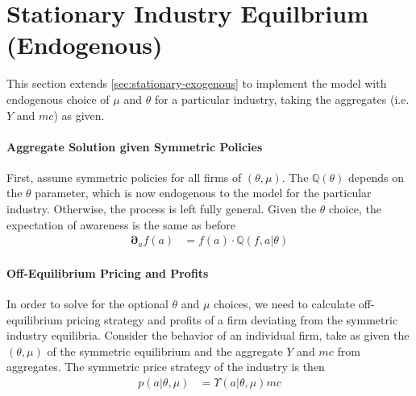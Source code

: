 \documentclass[12pt]{article}
\newcommand{\Q}[0]{\ensuremath{\mathbb{Q}}}
\newcommand{\D}[1][]{\ensuremath{\boldsymbol{\partial}_{#1}}}
\begin{document}
\section{Stationary Industry Equilbrium (Endogenous)}
This section extends \cref{sec:stationary-exogenous} to implement the model with endogenous choice of $\mu$ and $\theta$ for a particular industry, taking the aggregates (i.e. $Y$ and $mc$) as given.

\paragraph{Aggregate Solution given Symmetric Policies}
First, assume symmetric policies for all firms of $(\theta, \mu)$.  The $\Q(\theta)$ depends on the $\theta$ parameter, which is now endogenous to the model for the particular industry.  Otherwise, the process is left fully general.  Given the $\theta$ choice, the expectation of awareness is the same as before
\begin{align}
	\D[a]f(a) &= f(a) \cdot \Q(f, a|\theta)\label{eq:endogenous-evolution}
\end{align}

\paragraph{Off-Equilibrium Pricing and Profits}
In order to solve for the optional $\theta$ and $\mu$ choices, we need to calculate off-equilibrium pricing strategy and profits of a firm deviating from the symmetric industry equilibria.  Consider the behavior of an individual firm, take as given the $(\theta, \mu)$ of the symmetric equilibrium and the aggregate $Y$ and $mc$ from aggregates.  The symmetric price strategy of the industry is then
\begin{align}
	p(a | \theta, \mu) &= \Upsilon(a | \theta, \mu) mc \label{eq:p-endogenous}	
\end{align}
\end{document}
